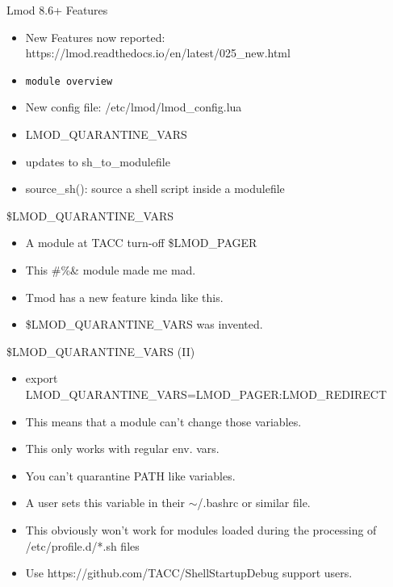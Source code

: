 \documentclass{beamer}
\begin{document}
\begin{frame}{Lmod 8.6+ Features}
  \begin{itemize}
    \item New Features now reported:
      https://lmod.readthedocs.io/en/latest/025\_new.html
    \item \texttt{module overview}
    \item New config file: /etc/lmod/lmod\_config.lua
    \item LMOD\_QUARANTINE\_VARS
    \item updates to sh\_to\_modulefile
    \item source\_sh(): source a shell script inside a modulefile
  \end{itemize}
\end{frame}

\begin{frame}{\$LMOD\_QUARANTINE\_VARS}
  \begin{itemize}
    \item A module at TACC turn-off  \$LMOD\_PAGER
    \item This \!\@\#\%\& module made me mad.
    \item Tmod has a new feature kinda like this.
    \item \$LMOD\_QUARANTINE\_VARS was invented.
  \end{itemize}
\end{frame}

\begin{frame}{\$LMOD\_QUARANTINE\_VARS (II)}
  \begin{itemize}
    \item export LMOD\_QUARANTINE\_VARS=LMOD\_PAGER:LMOD\_REDIRECT
    \item This means that a module can't change those variables.
    \item This only works with regular env. vars.
    \item You can't quarantine PATH like variables.
    \item A user sets this variable in their $\sim$/.bashrc or similar
      file.
    \item This obviously won't work for modules loaded during the
      processing of /etc/profile.d/*.sh files
    \item Use https://github.com/TACC/ShellStartupDebug support users.
  \end{itemize}
\end{frame}
\end{document}
